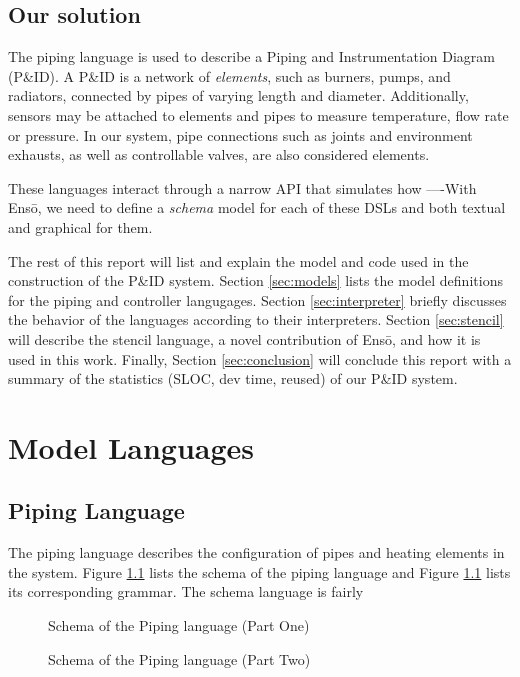 \documentclass[11pt]{article}
\def\Enso{Ens\={o}\xspace}
\begin{document}
\subsection{Our solution}

The piping language is used to describe a Piping and Instrumentation Diagram (P\&ID). A P\&ID is a network of \emph{elements}, such as burners, pumps, and radiators, connected by pipes of varying length and diameter. Additionally, sensors may be attached to elements and pipes to measure temperature, flow rate or pressure. In our system, pipe connections such as joints and environment exhausts, as well as controllable valves, are also considered elements.

These languages interact through a narrow API that simulates how 
----With \Enso, we need to define a \emph{schema} model for each of these DSLs and both textual and graphical for them.

The rest of this report will list and explain the model and code used in the construction of the P\&ID system. Section \ref{sec:models} lists the model definitions for the piping and controller langugages. Section \ref{sec:interpreter} briefly discusses the behavior of the languages according to their interpreters. Section \ref{sec:stencil} will describe the stencil language, a novel contribution of \Enso, and how it is used in this work. Finally, Section \ref{sec:conclusion} will conclude this report with a summary of the statistics (SLOC, dev time, reused) of our P\&ID system.

\section{Model Languages}

\subsection{Piping Language}

The piping language describes the configuration of pipes and heating elements in the system. Figure \ref{} lists the schema of the piping language and Figure \ref{} lists its corresponding grammar. The schema language is fairly 

\begin{figure}
\caption{Schema of the Piping language (Part One)}
\label{piping-grammar}
\end{figure}
\begin{figure}
\caption{Schema of the Piping language (Part Two)}
\label{piping-grammar}
\end{figure}
\end{document}

